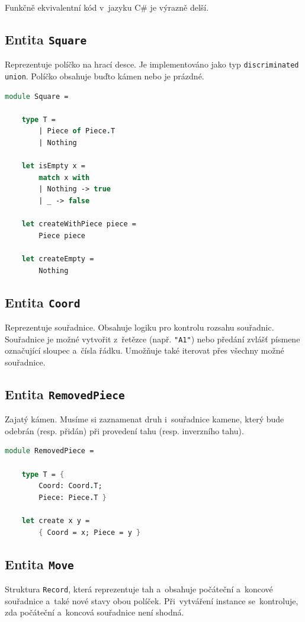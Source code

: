 \documentclass[12pt]{article}
\begin{document}
Funkčně ekvivalentní kód v~jazyku C\# je výrazně delší.

\subsection{Entita \texttt{Square}}
Reprezentuje políčko na hrací desce. Je implementováno jako typ \texttt{discriminated union}. Políčko obsahuje buďto kámen nebo je prázdné.
\begin{lstlisting}[language=FSharp]
module Square =

    type T =
        | Piece of Piece.T
        | Nothing

    let isEmpty x =
        match x with
        | Nothing -> true
        | _ -> false

    let createWithPiece piece =
        Piece piece

    let createEmpty =
        Nothing
\end{lstlisting}

\subsection{Entita \texttt{Coord}}
Reprezentuje souřadnice. Obsahuje logiku pro kontrolu rozsahu souřadnic. Souřadnice je možné vytvořit z~řetězce (např. \texttt{"A1"}) nebo předání zvlášť písmene označující sloupec a~čísla řádku.
Umožňuje také iterovat přes všechny možné souřadnice.

\subsection{Entita \texttt{RemovedPiece}}
Zajatý kámen. Musíme si zaznamenat druh i~souřadnice kamene, který bude odebrán (resp. přidán) při provedení tahu (resp. inverzního tahu).
\begin{lstlisting}[language=FSharp]
module RemovedPiece =

    type T = {
        Coord: Coord.T;
        Piece: Piece.T }
    
    let create x y =
        { Coord = x; Piece = y }
\end{lstlisting}

\subsection{Entita \texttt{Move}}
Struktura \texttt{Record}, která reprezentuje tah a~obsahuje počáteční a~koncové souřadnice a~také nové stavy obou políček. Při~vytváření instance se~kontroluje, zda počáteční a~koncová souřadnice není shodná.
\end{document}
